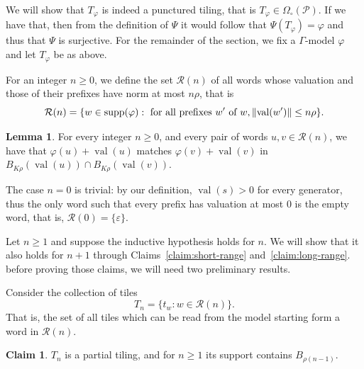 \documentclass{article}
\theoremstyle{definition}
\newtheorem{lemma}[theorem]{Lemma}
\newtheorem{claim}[theorem]{Claim} %
\theoremstyle{definition}
\newcommand{\PP}{\mathcal{P}}
\newcommand{\norm}[1]{\|{#1}\|}
\newcommand{\val}{\operatorname{val}}
\newcommand{\supp}{\textnormal{supp}}
\begin{document}
 


 
    We will show that $T_{\varphi}$ is indeed a punctured tiling, that is $T_{\varphi}\in \Omega_\circ(\PP)$. If we have that, then from the definition of $\Psi$ it would follow that $\Psi(T_{\varphi})=\varphi$ and thus that $\Psi$ is surjective. For the remainder of the section, we fix a $\Gamma$-model $\varphi$ and let $T_{\varphi}$ be as above.

    For an integer $n \geq 0$, we define the set $\mathcal{R}(n)$ of all words whose valuation and those of their prefixes have norm at most $n\rho$, that is  \[ \mathcal{R}(n) = \{ w \in \supp(\varphi): \mbox{ for all prefixes } w' \mbox{ of } w, \norm{\val(w')} \leq n\rho \}. \]
    
    \begin{lemma}\label{lem:induccion-culia-fea}%
        For every integer $n\geq 0$, and every pair of words $u,v\in \mathcal{R}(n)$, we have that $\varphi(u) + \val(u)$ matches $\varphi(v) + \val(v)$ in $B_{K\rho}(\val(u))\cap B_{K\rho}(\val(v))$.
    \end{lemma}

    The case $n=0$ is trivial: by our definition, $\val(s)>0$ for every generator, thus the only word such that every prefix has valuation at most $0$ is the empty word, that is, $\mathcal{R}(0) = \{\varepsilon\}$.

    Let $n \geq 1$ and suppose the inductive hypothesis holds for $n$. We will show that it also holds for $n+1$ through Claims~\ref{claim:short-range} and~\ref{claim:long-range}. before proving those claims, we will need two preliminary results.
    
    Consider the collection of tiles
    $$T_n = \{t_w : w \in \mathcal{R}(n)\}.$$
    That is, the set of all tiles which can be read from the model starting form a word in $\mathcal{R}(n)$. 

    \begin{claim}\label{claim:well-tiled-patch}
       $T_n$ is a partial tiling, and for $n \geq 1$ its support contains $B_{\rho (n-1)}$.
    \end{claim}
\end{document}
